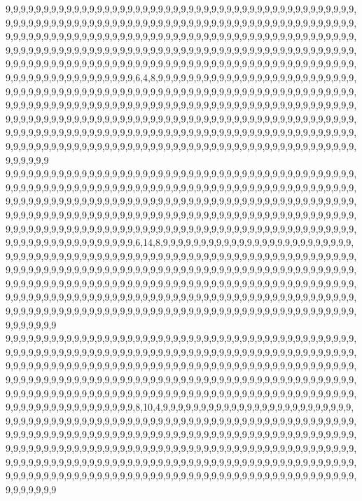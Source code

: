 9,9,9,9,9,9,9,9,9,9,9,9,9,9,9,9,9,9,9,9,9,9,9,9,9,9,9,9,9,9,9,9,9,9,9,9,9,9,9,9,9,9,9,9,9,9,9,9,9,9,9,9,9,9,9,9,9,9,9,9,9,9,9,9,9,9,9,9,9,9,9,9,9,9,9,9,9,9,9,9,9,9,9,9,9,9,9,9,9,9,9,9,9,9,9,9,9,9,9,9,9,9,9,9,9,9,9,9,9,9,9,9,9,9,9,9,9,9,9,9,9,9,9,9,9,9,9,9,9,9,9,9,9,9,9,9,9,9,9,9,9,9,9,9,9,9,9,9,9,9,9,9,9,9,9,9,9,9,9,9,9,9,9,9,9,9,9,9,9,9,9,9,9,9,9,9,9,9,9,9,9,9,9,9,9,9,9,9,9,9,9,9,9,9,9,9,9,9,9,9,9,9,9,9,9,9,9,9,9,9,9,9,9,9,9,9,9,9,9,9,9,9,9,9,9,9,9,9,9,9,9,9,9,9,9,9,9,9,9,9,9,9,9,9,9,9,9,6,4,8,9,9,9,9,9,9,9,9,9,9,9,9,9,9,9,9,9,9,9,9,9,9,9,9,9,9,9,9,9,9,9,9,9,9,9,9,9,9,9,9,9,9,9,9,9,9,9,9,9,9,9,9,9,9,9,9,9,9,9,9,9,9,9,9,9,9,9,9,9,9,9,9,9,9,9,9,9,9,9,9,9,9,9,9,9,9,9,9,9,9,9,9,9,9,9,9,9,9,9,9,9,9,9,9,9,9,9,9,9,9,9,9,9,9,9,9,9,9,9,9,9,9,9,9,9,9,9,9,9,9,9,9,9,9,9,9,9,9,9,9,9,9,9,9,9,9,9,9,9,9,9,9,9,9,9,9,9,9,9,9,9,9,9,9,9,9,9,9,9,9,9,9,9,9,9,9,9,9,9,9,9,9,9,9,9,9,9,9,9,9,9,9,9,9,9,9,9,9,9,9,9,9,9,9,9,9,9,9,9,9,9,9,9,9,9,9,9,9,9,9,9,9,9,9,9,9,9,9,9,9,9,9,9,9,9,9,9,9,9,9,9,9,9,9,9,9,9,9,9,9,9,9,9,9,9,9,9,9,9,9,9,9
9,9,9,9,9,9,9,9,9,9,9,9,9,9,9,9,9,9,9,9,9,9,9,9,9,9,9,9,9,9,9,9,9,9,9,9,9,9,9,9,9,9,9,9,9,9,9,9,9,9,9,9,9,9,9,9,9,9,9,9,9,9,9,9,9,9,9,9,9,9,9,9,9,9,9,9,9,9,9,9,9,9,9,9,9,9,9,9,9,9,9,9,9,9,9,9,9,9,9,9,9,9,9,9,9,9,9,9,9,9,9,9,9,9,9,9,9,9,9,9,9,9,9,9,9,9,9,9,9,9,9,9,9,9,9,9,9,9,9,9,9,9,9,9,9,9,9,9,9,9,9,9,9,9,9,9,9,9,9,9,9,9,9,9,9,9,9,9,9,9,9,9,9,9,9,9,9,9,9,9,9,9,9,9,9,9,9,9,9,9,9,9,9,9,9,9,9,9,9,9,9,9,9,9,9,9,9,9,9,9,9,9,9,9,9,9,9,9,9,9,9,9,9,9,9,9,9,9,9,9,9,9,9,9,9,9,9,9,9,9,9,9,9,9,9,9,9,6,14,8,9,9,9,9,9,9,9,9,9,9,9,9,9,9,9,9,9,9,9,9,9,9,9,9,9,9,9,9,9,9,9,9,9,9,9,9,9,9,9,9,9,9,9,9,9,9,9,9,9,9,9,9,9,9,9,9,9,9,9,9,9,9,9,9,9,9,9,9,9,9,9,9,9,9,9,9,9,9,9,9,9,9,9,9,9,9,9,9,9,9,9,9,9,9,9,9,9,9,9,9,9,9,9,9,9,9,9,9,9,9,9,9,9,9,9,9,9,9,9,9,9,9,9,9,9,9,9,9,9,9,9,9,9,9,9,9,9,9,9,9,9,9,9,9,9,9,9,9,9,9,9,9,9,9,9,9,9,9,9,9,9,9,9,9,9,9,9,9,9,9,9,9,9,9,9,9,9,9,9,9,9,9,9,9,9,9,9,9,9,9,9,9,9,9,9,9,9,9,9,9,9,9,9,9,9,9,9,9,9,9,9,9,9,9,9,9,9,9,9,9,9,9,9,9,9,9,9,9,9,9,9,9,9,9,9,9,9,9,9,9,9,9,9,9,9,9,9,9,9,9,9,9,9,9,9,9,9,9,9,9,9,9
9,9,9,9,9,9,9,9,9,9,9,9,9,9,9,9,9,9,9,9,9,9,9,9,9,9,9,9,9,9,9,9,9,9,9,9,9,9,9,9,9,9,9,9,9,9,9,9,9,9,9,9,9,9,9,9,9,9,9,9,9,9,9,9,9,9,9,9,9,9,9,9,9,9,9,9,9,9,9,9,9,9,9,9,9,9,9,9,9,9,9,9,9,9,9,9,9,9,9,9,9,9,9,9,9,9,9,9,9,9,9,9,9,9,9,9,9,9,9,9,9,9,9,9,9,9,9,9,9,9,9,9,9,9,9,9,9,9,9,9,9,9,9,9,9,9,9,9,9,9,9,9,9,9,9,9,9,9,9,9,9,9,9,9,9,9,9,9,9,9,9,9,9,9,9,9,9,9,9,9,9,9,9,9,9,9,9,9,9,9,9,9,9,9,9,9,9,9,9,9,9,9,9,9,9,9,9,9,9,9,9,9,9,9,9,9,9,9,9,9,9,9,9,9,9,9,9,9,9,9,9,9,9,9,9,9,9,9,9,9,9,9,9,9,9,9,9,8,10,4,9,9,9,9,9,9,9,9,9,9,9,9,9,9,9,9,9,9,9,9,9,9,9,9,9,9,9,9,9,9,9,9,9,9,9,9,9,9,9,9,9,9,9,9,9,9,9,9,9,9,9,9,9,9,9,9,9,9,9,9,9,9,9,9,9,9,9,9,9,9,9,9,9,9,9,9,9,9,9,9,9,9,9,9,9,9,9,9,9,9,9,9,9,9,9,9,9,9,9,9,9,9,9,9,9,9,9,9,9,9,9,9,9,9,9,9,9,9,9,9,9,9,9,9,9,9,9,9,9,9,9,9,9,9,9,9,9,9,9,9,9,9,9,9,9,9,9,9,9,9,9,9,9,9,9,9,9,9,9,9,9,9,9,9,9,9,9,9,9,9,9,9,9,9,9,9,9,9,9,9,9,9,9,9,9,9,9,9,9,9,9,9,9,9,9,9,9,9,9,9,9,9,9,9,9,9,9,9,9,9,9,9,9,9,9,9,9,9,9,9,9,9,9,9,9,9,9,9,9,9,9,9,9,9,9,9,9,9,9,9,9,9,9,9,9,9,9,9,9,9,9,9,9,9,9,9,9,9,9,9,9,9
